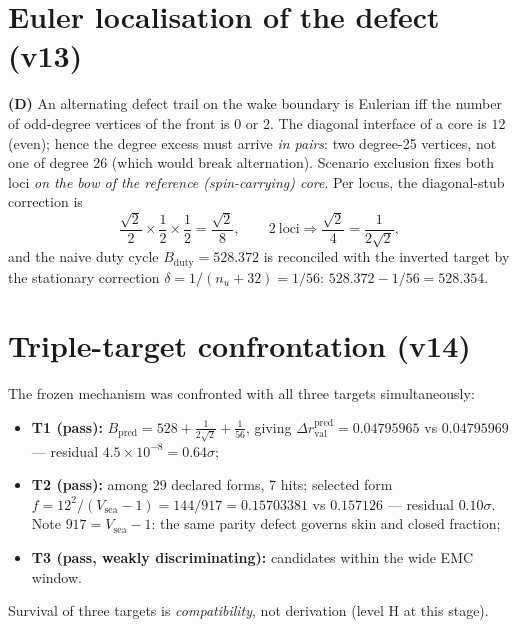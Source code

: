 \documentclass[11pt,a4paper]{article}
\newcommand{\Dr}{\Delta r_{\mathrm{val}}}
\newcommand{\Vsea}{V_{\mathrm{sea}}}
\begin{document}
\section{Euler localisation of the defect (v13)}
\textbf{(D)} An alternating defect trail on the wake boundary is Eulerian iff the number of odd-degree vertices of the front is $0$ or $2$. The diagonal interface of a core is $12$ (even); hence the degree excess must arrive \emph{in pairs}: two degree-25 vertices, not one of degree 26 (which would break alternation). Scenario exclusion fixes both loci \emph{on the bow of the reference (spin-carrying) core}. Per locus, the diagonal-stub correction is
\[
\frac{\sqrt{2}}{2}\times\frac{1}{2}\times\frac{1}{2} = \frac{\sqrt{2}}{8}, \qquad 2\ \text{loci} \Rightarrow \frac{\sqrt{2}}{4} = \frac{1}{2\sqrt{2}},
\]
and the naive duty cycle $B_{\mathrm{duty}} = 528.372$ is reconciled with the inverted target by the stationary correction $\delta = 1/(n_u+32) = 1/56$: $528.372 - 1/56 = 528.354$.

\section{Triple-target confrontation (v14)}
The frozen mechanism was confronted with all three targets simultaneously:
\begin{itemize}[leftmargin=1.6em]
\item \textbf{T1 (pass):} $B_{\mathrm{pred}} = 528 + \tfrac{1}{2\sqrt{2}} + \tfrac{1}{56}$, giving $\Dr^{\mathrm{pred}} = 0.04795965$ vs $0.04795969$ --- residual $4.5\times10^{-8} = 0.64\sigma$;
\item \textbf{T2 (pass):} among 29 declared forms, 7 hits; selected form $f = 12^{2}/(\Vsea - 1) = 144/917 = 0.15703381$ vs $0.157126$ --- residual $0.10\sigma$. Note $917 = \Vsea - 1$: the same parity defect governs skin and closed fraction;
\item \textbf{T3 (pass, weakly discriminating):} candidates within the wide EMC window.
\end{itemize}
Survival of three targets is \emph{compatibility}, not derivation (level H at this stage).
\end{document}
